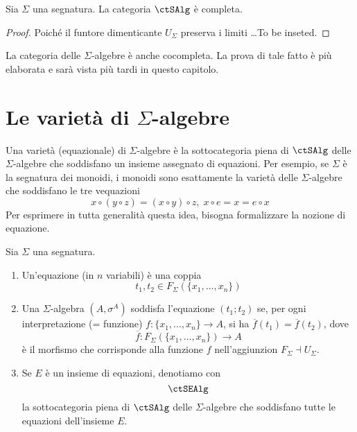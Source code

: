 \begin{proposition}\label{prop_alg_compl}
	Sia \(\Sigma\) una segnatura. La categoria \(\ctSAlg\) è completa.
\end{proposition}

\begin{proof}
	Poiché il funtore dimenticante \(U_{\Sigma}\) preserva i limiti \ldots To be inseted.
\end{proof}

La categoria delle \(\Sigma\)-algebre è anche cocompleta. La prova di tale fatto è più elaborata e sarà vista più tardi in questo capitolo.

\section{Le varietà di \(\Sigma\)-algebre}\label{sec_var_alg}

Una varietà (equazionale) di \(\Sigma\)-algebre è la sottocategoria piena di \(\ctSAlg\) delle \(\Sigma\)-algebre che soddisfano un insieme
assegnato di equazioni. Per esempio, se \(\Sigma\) è la segnatura dei monoidi, i monoidi sono esattamente la varietà delle \(\Sigma\)-algebre
che soddisfano le tre vequazioni
\[
	x \circ (y \circ z) = (x \circ y) \circ z, \; x \circ e = x = e \circ x
\]
Per esprimere in tutta generalità questa idea, bisogna formalizzare la nozione di equazione.

\begin{definition}\label{def_equaz_alg}
	Sia \(\Sigma\) una segnatura.
	\begin{enumerate}
		\item Un'equazione (in \(n\) variabili) è una coppia
		      \[
			      t_1,t_2 \in F_{\Sigma}(\{x_1,\ldots,x_n\})
		      \]
		\item Una \(\Sigma\)-algebra \((A,\sigma^A)\) soddisfa l'equazione \((t_1;t_2)\) se, per ogni interpretazione (= funzione)
		      \(f \colon \{x_1,\ldots,x_n\} \to A\),
		      si ha \(\overline{f}(t_1) = \overline{f}(t_2)\), dove
		      \[
			      \overline{f} \colon F_{\Sigma}(\{x_1,\ldots,x_n\}) \to A
		      \]
		      è il morfismo che corrisponde alla funzione \(f\) nell'aggiunzion \(F_{\Sigma} \dashv U_{\Sigma}\).
		\item Se \(E\) è un insieme di equazioni, denotiamo con
		      \[
			      \ctSEAlg
		      \]
		      la sottocategoria piena di \(\ctSAlg\) delle \(\Sigma\)-algebre che soddisfano tutte le equazioni dell'insieme \(E\).
	\end{enumerate}
\end{definition}


